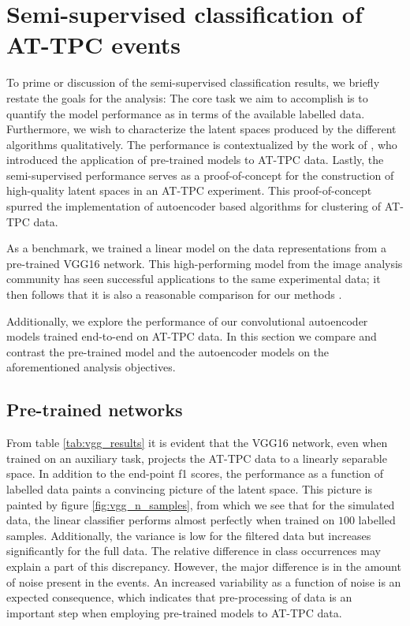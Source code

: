 \section{Semi-supervised classification of AT-TPC events}

To prime or discussion of the semi-supervised classification results, we briefly restate the goals for the analysis: The core task we aim to accomplish is to quantify the model performance as in terms of the available labelled data. Furthermore, we wish to characterize the latent spaces produced by the different algorithms qualitatively. The performance is contextualized by the work of \citet{Kuchera2019}, who introduced the application of pre-trained models to AT-TPC data. Lastly, the semi-supervised performance serves as a proof-of-concept for the construction of high-quality latent spaces in an AT-TPC experiment. This proof-of-concept spurred the implementation of autoencoder based algorithms for clustering of AT-TPC data.

As a benchmark, we trained a linear model on the data representations from a pre-trained VGG16 network. This high-performing model from the image analysis community has seen successful applications to the same experimental data; it then follows that it is also a reasonable comparison for our methods \cite{Kuchera2019}. 

Additionally, we explore the performance of our convolutional autoencoder models trained end-to-end on AT-TPC data. In this section we compare and contrast the pre-trained model and the autoencoder models on the aforementioned analysis objectives.

\subsection{Pre-trained networks}

From table \ref{tab:vgg_results} it is evident that the VGG16 network, even when trained on an auxiliary task, projects the AT-TPC data to a linearly separable space. In addition to the end-point f1 scores, the performance as  a function of labelled data paints a convincing picture of the latent space. This picture is painted by figure \ref{fig:vgg_n_samples}, from which we see that for the simulated data, the linear classifier performs almost perfectly when trained on $100$ labelled samples. Additionally, the variance is low for the filtered data but increases significantly for the full data. The relative difference in class occurrences may explain a part of this discrepancy. However, the major difference is in the amount of noise present in the events. An increased variability as a function of noise is an expected consequence, which indicates that pre-processing of data is an important step when employing pre-trained models to AT-TPC data. 


